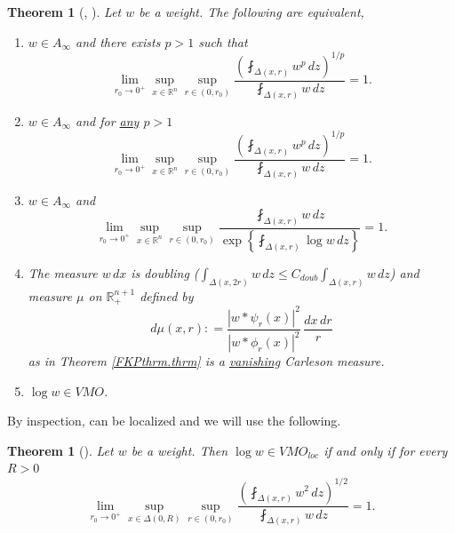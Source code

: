 \documentclass[11pt, a4paper,leqno]{amsart}
\theoremstyle{plain}
\newtheorem{theorem}[equation]{Theorem}
\theoremstyle{definition}
\theoremstyle{remark}
\numberwithin{equation}{section}
\newcommand{\rn}{\mathbb{R}^n}
\newcommand{\ree}{\mathbb{R}^{n+1}}
\begin{document}
\begin{theorem}[{\cite[Theorem 1]{Kor}, \cite[Theorem 10]{Kor2}}]\label{Koreyequiv.thrm}
Let $w$ be a weight.
The following are equivalent,
\begin{enumerate}
\item $w \in A_\infty$ and there exists $p > 1$ such that 
\[\lim_{r_0 \to 0^+} \sup_{x \in \rn} \sup_{r \in (0,r_0)} \frac{\left(\fint_{\Delta(x,r)} w^p \, dz \right)^{1/p}}{\fint_{\Delta(x,r)} w \, dz}  = 1.\]
\item $w \in A_\infty$ and for \underline{any} $p > 1$
\[\lim_{r_0 \to 0^+} \sup_{x \in \rn} \sup_{r \in (0,r_0)} \frac{\left(\fint_{\Delta(x,r)} w^p \, dz \right)^{1/p}}{\fint_{\Delta(x,r)} w \, dz}  = 1.\]
\item $w \in A_\infty$ and
\[\lim_{r_0 \to 0^+} \sup_{x \in \rn} \sup_{r \in (0,r_0)} \frac{\fint_{\Delta(x,r)} w \, dz}{\exp\left\{\fint_{\Delta(x,r)} \log w \, dz \right\}} = 1.\]

\item The measure $w \,dx$ is doubling ($\int_{\Delta(x,2r)} w \, dz \le C_{doub} \int_{\Delta(x,r)} w \, dz$) and measure $\mu$ on $\ree_+$ defined by 
\[d\mu(x,r): = \frac{|w \ast \psi_r(x)|^2}{|w \ast \phi_r(x)|^2} \, \frac{dx \, dr}{r}\]
as in Theorem \ref{FKPthrm.thrm} is a \underline{vanishing} Carleson measure.
\item $\log w \in VMO$.
\end{enumerate}
\end{theorem}

By inspection, \cite[Theorem 10]{Kor2} can be localized and we will use the following. 
\begin{theorem}[{\cite[Theorem 10]{Kor2}}]\label{VMOlocKorey.thrm}
Let $w$ be a weight. Then $\log w \in VMO_{loc}$ if and only if for every $R > 0$
\[\lim_{r_0 \to 0^+} \sup_{x \in \Delta(0,R)} \sup_{r \in (0,r_0)} \frac{\left(\fint_{\Delta(x,r)} w^2 \, dz \right)^{1/2}}{\fint_{\Delta(x,r)} w \, dz}  = 1.\]
\end{theorem}
\end{document}
